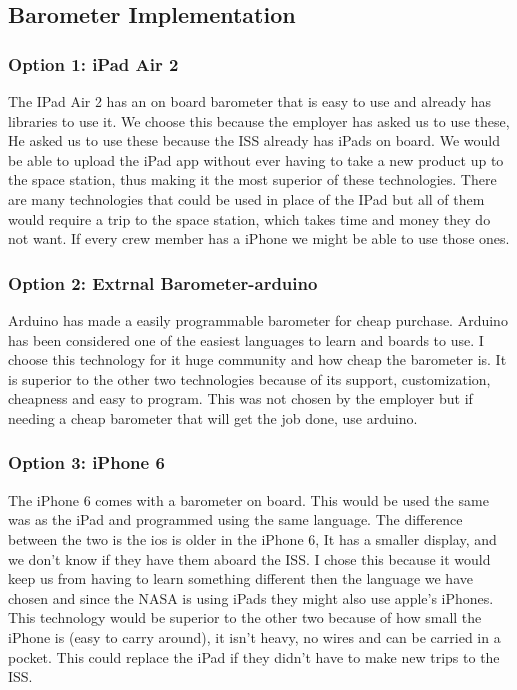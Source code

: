 \documentclass[onecolumn, draftclsnofoot,10pt, compsoc]{IEEEtran}
\begin{document}
\subsection{Barometer Implementation}
\subsubsection{Option 1: iPad Air 2}
The IPad Air 2 has an on board barometer that is easy to use and already has libraries to use it.
We choose this because the employer has asked us to use these, He asked us to use these because the ISS already has iPads on board.
We would be able to upload the iPad app without ever having to take a new product up to the space station, thus making it the most superior of these technologies.
 There are many technologies that could be used in place of the IPad but all of them would require a trip to the space station, which takes time and money they do not want.
 If every crew member has a iPhone we might be able to use those ones.

\subsubsection{Option 2:	Extrnal Barometer-arduino }
Arduino has made a easily programmable barometer for cheap purchase.
 Arduino has been considered one of the easiest languages to learn and boards to use.
I choose this technology for it huge community and how cheap the barometer is.
 It is superior to the other two technologies because of its support, customization, cheapness and easy to program.
This was not chosen by the employer but if needing a cheap barometer that will get the job done, use arduino.

\subsubsection{Option 3: iPhone 6}
The iPhone 6 comes with a barometer on board.
 This would be used the same was as the iPad and programmed using the same language.
 The difference between the two is the ios is older in the iPhone 6, It has a smaller display, and we don't know if they have them aboard the ISS.
 I chose this because it would keep us from having to learn something different then the language we have chosen and since the NASA is using iPads they might also use apple's iPhones.
 This technology would be superior to the other two because of how small the iPhone is (easy to carry around), it isn't heavy, no wires and can be carried in a pocket.
This could replace the iPad if they didn't have to make new trips to the ISS.
\end{document}
